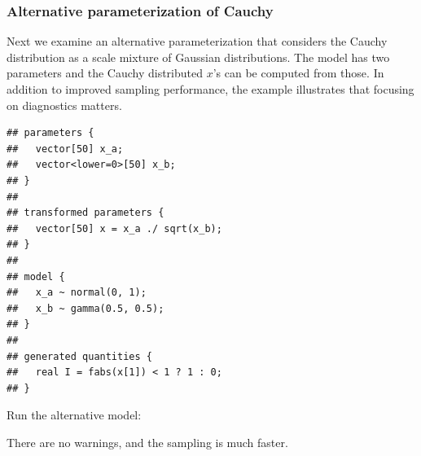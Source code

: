 \documentclass[american,]{article}
\begin{document}
\hypertarget{alternative-parameterization-of-cauchy}{%
\subsubsection{Alternative parameterization of
Cauchy}\label{alternative-parameterization-of-cauchy}}

Next we examine an alternative parameterization that considers the
Cauchy distribution as a scale mixture of Gaussian distributions. The
model has two parameters and the Cauchy distributed \(x\)'s can be
computed from those. In addition to improved sampling performance, the
example illustrates that focusing on diagnostics matters.

\begin{verbatim}
## parameters {
##   vector[50] x_a;
##   vector<lower=0>[50] x_b;
## }
## 
## transformed parameters {
##   vector[50] x = x_a ./ sqrt(x_b);
## }
## 
## model {
##   x_a ~ normal(0, 1);
##   x_b ~ gamma(0.5, 0.5);
## }
## 
## generated quantities {
##   real I = fabs(x[1]) < 1 ? 1 : 0;
## }
\end{verbatim}

Run the alternative model:

There are no warnings, and the sampling is much faster.
\end{document}
